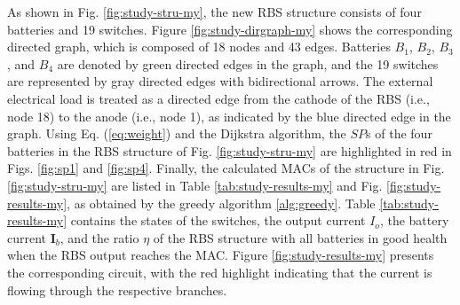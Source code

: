 \documentclass{article}
\begin{document}
As shown in Fig. \ref{fig:study-stru-my}, the new RBS structure consists of four batteries and 19 switches. 
Figure \ref{fig:study-dirgraph-my} shows the corresponding directed graph, which is composed of 18 nodes and 43 edges. 
Batteries $B_1$, $B_2$, $B_3$, and $B_4$ are denoted by green directed edges in the graph, and the 19 switches are represented by gray directed edges with bidirectional arrows. 
The external electrical load is treated as a directed edge from the cathode of the RBS (i.e., node 18) to the anode (i.e., node 1), as indicated by the blue directed edge in the graph.
Using Eq. (\ref{eq:weight}) and the Dijkstra algorithm, the $SP$s of the four batteries in the RBS structure of Fig. \ref{fig:study-stru-my} are highlighted in red in Figs. \ref{fig:sp1} and \ref{fig:sp4}.
Finally, the calculated MACs of the structure in Fig. \ref{fig:study-stru-my} are listed in Table \ref{tab:study-results-my} and Fig. \ref{fig:study-results-my}, as obtained by the greedy algorithm \ref{alg:greedy}.
Table \ref{tab:study-results-my} contains the states of the switches, the output current $I_o$, the battery current $\bm{I}_b$, and the ratio $\eta$ of the RBS structure with all batteries in good health when the RBS output reaches the MAC.
Figure \ref{fig:study-results-my} presents the corresponding circuit, with the red highlight indicating that the current is flowing through the respective branches.
\end{document}
